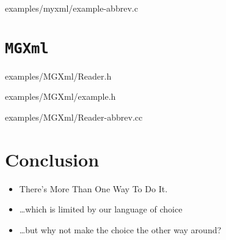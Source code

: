 \documentclass{beamer}
\begin{document}
\begin{frame}[fragile]

	{examples/myxml/example-abbrev.c}
\end{frame}

\section{\texttt{MGXml}}

\begin{frame}[fragile]

	{examples/MGXml/Reader.h}
\end{frame}

\begin{frame}[fragile]

	{examples/MGXml/example.h}
\end{frame}

\begin{frame}[fragile]

	{examples/MGXml/Reader-abbrev.cc}
\end{frame}

\section{Conclusion}

\begin{frame}
\begin{itemize}
\item	There's More Than One Way To Do It.
\item	\dots which is limited by our language of choice
\item	\dots but why not make the choice the other way around?
\end{itemize}
\end{frame}
\end{document}
